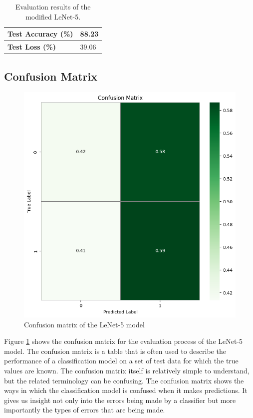 \begin{longtable}{|p{3.5cm}|p{2cm}|}
    \caption{Evaluation results of the modified LeNet-5.}
    \label{table:evaluate}\\
    \hline
    \textbf{Test Accuracy (\%)} & 88.23 \\
    \hline
    \textbf{Test Loss (\%)} & 39.06 \\ \hline
    
\end{longtable}

\subsection{Confusion Matrix}

\begin{figure}[h]
    \centering
    \includegraphics[scale=0.6]{mainmatter/images/results/conf-matrix.png}
    \caption{Confusion matrix of the LeNet-5 model}
    \label{fig:confusion-matrix}
\end{figure}

Figure \ref{fig:confusion-matrix} shows the confusion matrix for the evaluation process of the LeNet-5 model. The confusion matrix is a table that is often used to describe the performance of a classification model on a set of test data for which the true values are known. The confusion matrix itself is relatively simple to understand, but the related terminology can be confusing. The confusion matrix shows the ways in which the classification model is confused when it makes predictions. It gives us insight not only into the errors being made by a classifier but more importantly the types of errors that are being made.

